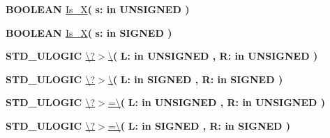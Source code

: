 \begin{DoxyCompactItemize}
\item 
{\bfseries {\bfseries \textcolor{comment}{B\+O\+O\+L\+E\+A\+N}\textcolor{vhdlchar}{ }}} \hyperlink{class__fixed__pkg_a6112d0830877a49e7b079106f08da1e1}{Is\+\_\+\+X}{\bfseries  ( }{\bfseries \textcolor{vhdlchar}{s\+: }\textcolor{stringliteral}{in }{\bfseries \textcolor{comment}{U\+N\+S\+I\+G\+N\+E\+D}\textcolor{vhdlchar}{ }}}{\bfseries  )} 
\item 
{\bfseries {\bfseries \textcolor{comment}{B\+O\+O\+L\+E\+A\+N}\textcolor{vhdlchar}{ }}} \hyperlink{class__fixed__pkg_a6112d0830877a49e7b079106f08da1e1}{Is\+\_\+\+X}{\bfseries  ( }{\bfseries \textcolor{vhdlchar}{s\+: }\textcolor{stringliteral}{in }{\bfseries \textcolor{comment}{S\+I\+G\+N\+E\+D}\textcolor{vhdlchar}{ }}}{\bfseries  )} 
\item 
{\bfseries {\bfseries \textcolor{comment}{S\+T\+D\+\_\+\+U\+L\+O\+G\+I\+C}\textcolor{vhdlchar}{ }}} \hyperlink{class__fixed__pkg_a28cc0c1d8980098982ca0485b5f2fe71}{\textbackslash{}?$>$\textbackslash{}}{\bfseries  ( }{\bfseries \textcolor{vhdlchar}{L\+: }\textcolor{stringliteral}{in }{\bfseries \textcolor{comment}{U\+N\+S\+I\+G\+N\+E\+D}\textcolor{vhdlchar}{ }}}{\bfseries  , \textcolor{vhdlchar}{R\+: }\textcolor{stringliteral}{in }{\bfseries \textcolor{comment}{U\+N\+S\+I\+G\+N\+E\+D}\textcolor{vhdlchar}{ }}}{\bfseries  )} 
\item 
{\bfseries {\bfseries \textcolor{comment}{S\+T\+D\+\_\+\+U\+L\+O\+G\+I\+C}\textcolor{vhdlchar}{ }}} \hyperlink{class__fixed__pkg_a28cc0c1d8980098982ca0485b5f2fe71}{\textbackslash{}?$>$\textbackslash{}}{\bfseries  ( }{\bfseries \textcolor{vhdlchar}{L\+: }\textcolor{stringliteral}{in }{\bfseries \textcolor{comment}{S\+I\+G\+N\+E\+D}\textcolor{vhdlchar}{ }}}{\bfseries  , \textcolor{vhdlchar}{R\+: }\textcolor{stringliteral}{in }{\bfseries \textcolor{comment}{S\+I\+G\+N\+E\+D}\textcolor{vhdlchar}{ }}}{\bfseries  )} 
\item 
{\bfseries {\bfseries \textcolor{comment}{S\+T\+D\+\_\+\+U\+L\+O\+G\+I\+C}\textcolor{vhdlchar}{ }}} \hyperlink{class__fixed__pkg_a5e612bbbb0da47cd9a87053bf3bc3697}{\textbackslash{}?$>$=\textbackslash{}}{\bfseries  ( }{\bfseries \textcolor{vhdlchar}{L\+: }\textcolor{stringliteral}{in }{\bfseries \textcolor{comment}{U\+N\+S\+I\+G\+N\+E\+D}\textcolor{vhdlchar}{ }}}{\bfseries  , \textcolor{vhdlchar}{R\+: }\textcolor{stringliteral}{in }{\bfseries \textcolor{comment}{U\+N\+S\+I\+G\+N\+E\+D}\textcolor{vhdlchar}{ }}}{\bfseries  )} 
\item 
{\bfseries {\bfseries \textcolor{comment}{S\+T\+D\+\_\+\+U\+L\+O\+G\+I\+C}\textcolor{vhdlchar}{ }}} \hyperlink{class__fixed__pkg_a5e612bbbb0da47cd9a87053bf3bc3697}{\textbackslash{}?$>$=\textbackslash{}}{\bfseries  ( }{\bfseries \textcolor{vhdlchar}{L\+: }\textcolor{stringliteral}{in }{\bfseries \textcolor{comment}{S\+I\+G\+N\+E\+D}\textcolor{vhdlchar}{ }}}{\bfseries  , \textcolor{vhdlchar}{R\+: }\textcolor{stringliteral}{in }{\bfseries \textcolor{comment}{S\+I\+G\+N\+E\+D}\textcolor{vhdlchar}{ }}}{\bfseries  )} 

\end{DoxyCompactItemize}
